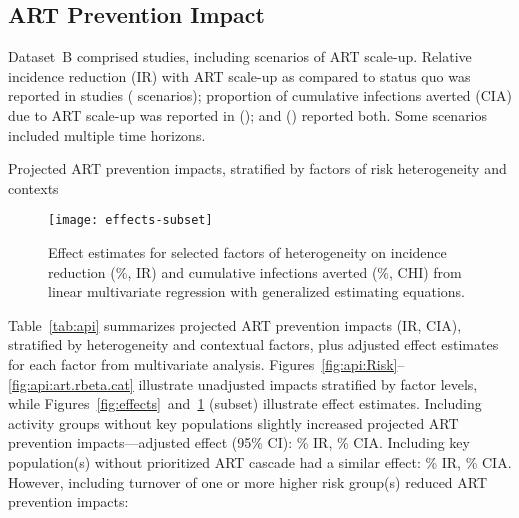 \subsection{ART Prevention Impact}
\label{ss:res:api}
Dataset~B comprised  studies,
including  scenarios of ART scale-up.
Relative incidence reduction (IR) with ART scale-up as compared to status quo
was reported in  studies ( scenarios);
proportion of cumulative infections averted (CIA) due to ART scale-up
was reported in  ();
and  () reported both.
Some scenarios included multiple time horizons.
\par
\begin{table}
  \centering
  \caption{Projected ART prevention impacts,
    stratified by factors of risk heterogeneity and contexts}
  
  \label{tab:api}
\end{table}
\begin{figure}
  \centering
  \texttt{[image: effects-subset]}
  \caption{Effect estimates for selected factors of heterogeneity on
    incidence reduction (\%, IR) and cumulative infections averted (\%, CHI)
    from linear multivariate regression with generalized estimating equations.}
  \label{fig:effects-sub}
\end{figure}
Table~\ref{tab:api} summarizes projected ART prevention impacts (IR, CIA),
stratified by heterogeneity and contextual factors,
plus adjusted effect estimates for each factor from multivariate analysis.
Figures~\ref{fig:api:Risk}--\ref{fig:api:art.rbeta.cat} illustrate
unadjusted impacts stratified by factor levels, while
Figures~\ref{fig:effects}~and~\ref{fig:effects-sub} (subset) illustrate effect estimates.
Including activity groups without key populations
slightly increased projected ART prevention impacts---adjusted effect (95\% CI):
\% IR, \% CIA.
Including key population(s) without prioritized ART cascade had a similar effect:
\% IR, \% CIA.
However, including turnover of one or more higher risk group(s) reduced ART prevention impacts:
